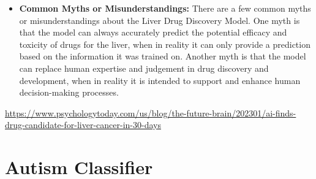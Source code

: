 \begin{itemize}
    \item \textbf{Common Myths or Misunderstandings:} There are a few common myths or misunderstandings about the Liver Drug Discovery Model. One myth is that the model can always accurately predict the potential efficacy and toxicity of drugs for the liver, when in reality it can only provide a prediction based on the information it was trained on. Another myth is that the model can replace human expertise and judgement in drug discovery and development, when in reality it is intended to support and enhance human decision-making processes.
\end{itemize}

\url{https://www.psychologytoday.com/us/blog/the-future-brain/202301/ai-finds-drug-candidate-for-liver-cancer-in-30-days}

\section{Autism Classifier}


